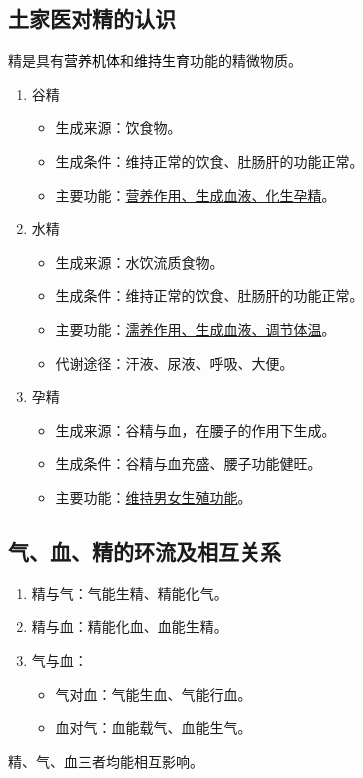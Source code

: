 \documentclass[cn,hazy,black,12pt,normal,founder]{elegantnote}
\newcommand{\redt}[1]{\textcolor{black}{{}#1}}      %
\begin{document}
\subsection{土家医对精的认识}

精是具有\redt{营养机体}和\redt{维持生育}功能的精微物质。

\begin{enumerate}
  \item 谷精
  \begin{itemize}
    \item 生成来源：饮食物。
    \item 生成条件：维持正常的饮食、肚肠肝的功能正常。
    \item 主要功能：\uline{营养作用、生成血液、化生孕精}。
  \end{itemize}
  \item 水精
  \begin{itemize}
    \item 生成来源：水饮流质食物。
    \item 生成条件：维持正常的饮食、肚肠肝的功能正常。
    \item 主要功能：\uline{濡养作用、生成血液、调节体温}。
    \item 代谢途径：汗液、尿液、呼吸、大便。
  \end{itemize}
  \item 孕精
  \begin{itemize}
    \item 生成来源：谷精与血，在腰子的作用下生成。
    \item 生成条件：谷精与血充盛、腰子功能健旺。
    \item 主要功能：\uline{维持男女生殖功能}。
  \end{itemize}
\end{enumerate}

\subsection{气、血、精的环流及相互关系}

\begin{enumerate}
  \item 精与气：气能生精、精能化气。
  \item 精与血：精能化血、血能生精。
  \item 气与血：
  \begin{itemize}
    \item 气对血：气能生血、气能行血。
    \item 血对气：血能载气、血能生气。
  \end{itemize}
\end{enumerate}
\begin{note}
  精、气、血三者均能相互影响。
\end{note}
\end{document}
